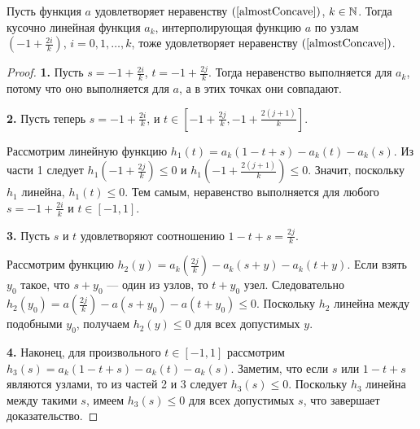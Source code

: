 \begin{lm}
\label{piecewiseLinearConcave}
Пусть функция $a$ удовлетворяет неравенству $(\ref{almostConcave})$, $k \in \mathbb N$.
Тогда кусочно линейная функция $a_k$, интерполирующая функцию $a$ по узлам
$(-1 + \frac{2i}{k})$, $i = 0, 1, \dots, k$, тоже удовлетворяет неравенству $(\ref{almostConcave})$.
\end{lm}
\begin{proof}
\textbf{1.}
Пусть $s = -1 + \frac{2i}{k}$, $t = -1 + \frac{2j}{k}$.
Тогда неравенство выполняется для $a_k$, потому что оно выполняется для $a$,
а в этих точках они совпадают.

\textbf{2.}
Пусть теперь $s = -1 + \frac{2i}{k}$, и $t \in [-1 + \frac{2j}{k}, -1 + \frac{2(j + 1)}{k}]$.

Рассмотрим линейную функцию $h_1(t) = a_k( 1 - t + s ) - a_k(t) - a_k(s)$.
Из части 1 следует $h_1(-1 + \frac{2j}{k}) \le 0$ и $h_1(-1 + \frac{2(j + 1)}{k}) \le 0$.
Значит, поскольку $h_1$ линейна, $h_1(t) \le 0$.
Тем самым, неравенство выполняется для любого $s = -1 + \frac{2i}{k}$ и $t \in [-1, 1]$.

\textbf{3.}
Пусть $s$ и $t$ удовлетворяют соотношению $1 - t + s = \frac{2j}{k}$.

Рассмотрим функцию $h_2(y) = a_k(\frac{2j}{k}) - a_k(s + y) - a_k(t + y)$.
Если взять $y_0$ такое, что $s + y_0$ --- один из узлов, то $t + y_0$ узел.
Следовательно $h_2(y_0) = a(\frac{2j}{k}) - a(s + y_0) - a(t + y_0) \le 0$.
Поскольку $h_2$ линейна между подобными $y_0$, получаем $h_2(y) \le 0$ для всех допустимых $y$.

\textbf{4.}
Наконец, для произвольного $t \in [-1, 1]$ рассмотрим $h_3(s) = a_k( 1 - t + s ) - a_k(t) - a_k(s)$.
Заметим, что если $s$ или $1 - t + s$ являются узлами, то из частей 2 и 3 следует $h_3(s) \le 0$.
Поскольку $h_3$ линейна между такими $s$, имеем $h_3(s) \le 0$ для всех допустимых $s$, что завершает доказательство.
\end{proof}
